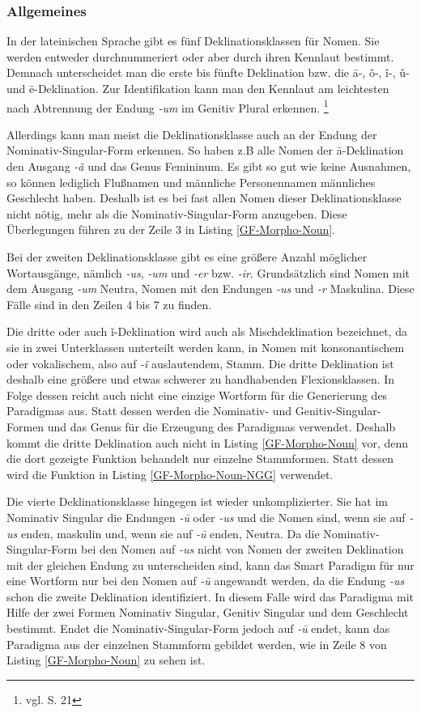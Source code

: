 \subsubsection{Allgemeines}
In der lateinischen Sprache gibt es fünf Deklinationsklassen für Nomen. Sie werden entweder durchnummeriert oder aber durch ihren Kennlaut bestimmt. Demnach unterscheidet man die erste bis fünfte Deklination bzw. die ā-, ǒ-, ǐ-, ǔ- und ē-Deklination. Zur Identifikation kann man den Kennlaut am leichtesten nach Abtrennung der Endung \textit{-um} im Genitiv Plural erkennen. \footnote{vgl. \cite{BAYER-LINDAUER1994} S. 21}\par
Allerdings kann man meist die Deklinationsklasse auch an der Endung der No\-mi\-na\-tiv-Singular-Form erkennen. So haben z.B alle Nomen der ā-Deklination den Ausgang \textit{-ǎ} und das Genus Femininum. Es gibt so gut wie keine Ausnahmen, so können lediglich Flußnamen und männliche Personennamen männliches Geschlecht haben. Deshalb ist es bei fast allen Nomen dieser Deklinationsklasse nicht nötig, mehr als die Nominativ-Singular-Form anzugeben. Diese Überlegungen führen zu der Zeile 3 in Listing \ref{GF-Morpho-Noun}.\par
Bei der zweiten Deklinationsklasse gibt es eine größere Anzahl möglicher Wortausgänge, nämlich \textit{-us}, \textit{-um} und \textit{-er} bzw. \textit{-ir}. Grundsätzlich sind Nomen mit dem Ausgang \textit{-um} Neutra, Nomen mit den Endungen \textit{-us} und \textit{-r} Maskulina. Diese Fälle sind in den Zeilen 4 bis 7 zu finden. \par
Die dritte oder auch ǐ-Deklination wird auch als Mischdeklination bezeichnet, da sie in zwei Unterklassen unterteilt werden kann, in Nomen mit konsonantischem oder vokalischem, also auf \textit{-ǐ} auslautendem, Stamm. Die dritte Deklination ist deshalb eine größere und etwas schwerer zu handhabenden Flexionsklassen. In Folge dessen reicht auch nicht eine einzige Wortform für die Generierung des Paradigmas aus. Statt dessen werden die Nominativ- und Genitiv-Singular-Formen und das Genus für die Erzeugung des Paradigmas verwendet. Deshalb kommt die dritte Deklination auch nicht in Listing \ref{GF-Morpho-Noun} vor, denn die dort gezeigte Funktion behandelt nur einzelne Stammformen. Statt dessen wird die Funktion in Listing \ref{GF-Morpho-Noun-NGG} verwendet.\par
Die vierte Deklinationsklasse hingegen ist wieder unkomplizierter. Sie hat im Nominativ Singular die Endungen \textit{-ū} oder \textit{-us} und die Nomen sind, wenn sie auf \textit{-us} enden, maskulin und, wenn sie auf \textit{-ū} enden, Neutra. Da die Nominativ-Singular-Form bei den Nomen auf \textit{-us} nicht von Nomen der zweiten Deklination mit der gleichen Endung zu unterscheiden sind, kann das Smart Paradigm für nur eine Wortform nur bei den Nomen auf \textit{-ū} angewandt werden, da die Endung \textit{-us} schon die zweite Deklination identifiziert. In diesem Falle wird das Paradigma mit Hilfe der zwei Formen Nominativ Singular, Genitiv Singular und dem Geschlecht bestimmt. Endet die Nominativ-Singular-Form jedoch auf \textit{-ū} endet, kann das Paradigma aus der einzelnen Stammform gebildet werden, wie in Zeile 8 von Listing \ref{GF-Morpho-Noun} zu sehen ist. \par
